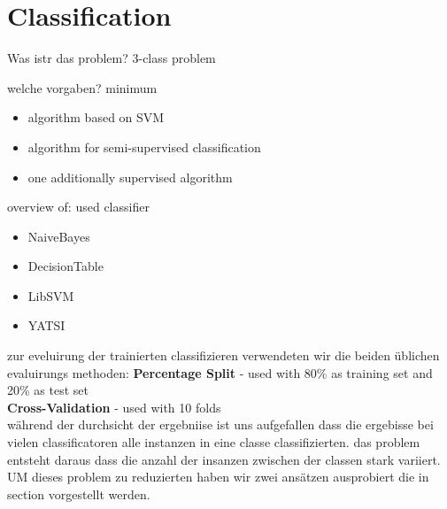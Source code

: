 \section{Classification}
\label{classification}

Was istr das problem?
3-class problem


welche vorgaben?
minimum
\begin{itemize}
	\item[\textbullet] algorithm based on SVM
	\item[\textbullet] algorithm for semi-supervised classification
	\item[\textbullet] one additionally supervised algorithm
\end{itemize}


overview of:
used classifier





\begin{itemize}
	\item[\textbullet] NaiveBayes
	\item[\textbullet] DecisionTable
	\item[\textbullet] LibSVM
	\item[\textbullet] YATSI
\end{itemize}


zur eveluirung der trainierten classifizieren verwendeten wir die beiden üblichen evaluirungs methoden:
\textbf{Percentage Split} - used with 80\% as training set and 20\% as test set\\
\textbf{Cross-Validation} - used with 10 folds\\


während der durchsicht der ergebniise ist uns aufgefallen dass die ergebisse bei vielen classificatoren alle instanzen in eine classe classifizierten. das problem entsteht daraus dass die anzahl der insanzen zwischen der classen stark variiert.
UM dieses problem zu reduzierten haben wir zwei ansätzen ausprobiert die in section 
vorgestellt werden.





